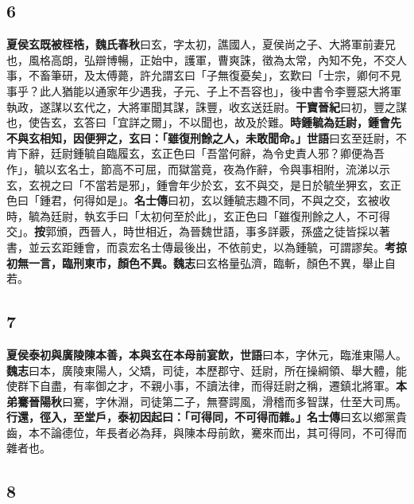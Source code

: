\subsection*{6}

\textbf{夏侯玄既被桎梏，}{\footnotesize \textbf{魏氏春秋}曰玄，字太初，譙國人，夏侯尚之子、大將軍前妻兄也，風格高朗，弘辯博暢，正始中，護軍，曹爽誅，徵為太常，內知不免，不交人事，不畜筆研，及太傅薨，許允謂玄曰「子無復憂矣」，玄歎曰「士宗，卿何不見事乎？此人猶能以通家年少遇我，子元、子上不吾容也」，後中書令李豐惡大將軍執政，遂謀以玄代之，大將軍聞其謀，誅豐，收玄送廷尉。\textbf{干寶晉紀}曰初，豐之謀也，使告玄，玄答曰「宜詳之爾」，不以聞也，故及於難。}\textbf{時鍾毓為廷尉，鍾會先不與玄相知，因便狎之，玄曰：「雖復刑餘之人，未敢聞命。」}{\footnotesize \textbf{世語}曰玄至廷尉，不肯下辭，廷尉鍾毓自臨履玄，玄正色曰「吾當何辭，為令史責人邪？卿便為吾作」，毓以玄名士，節高不可屈，而獄當竟，夜為作辭，令與事相附，流涕以示玄，玄視之曰「不當若是邪」，鍾會年少於玄，玄不與交，是日於毓坐狎玄，玄正色曰「鍾君，何得如是」。\textbf{名士傳}曰初，玄以鍾毓志趣不同，不與之交，玄被收時，毓為廷尉，執玄手曰「太初何至於此」，玄正色曰「雖復刑餘之人，不可得交」。\textbf{按}郭頒，西晉人，時世相近，為晉魏世語，事多詳覈，孫盛之徒皆採以著書，並云玄距鍾會，而袁宏名士傳最後出，不依前史，以為鍾毓，可謂謬矣。}\textbf{考掠初無一言，臨刑東市，顏色不異。}{\footnotesize \textbf{魏志}曰玄格量弘濟，臨斬，顏色不異，舉止自若。}

\subsection*{7}

\textbf{夏侯泰初與廣陵陳本善，本與玄在本母前宴飲，}{\footnotesize \textbf{世語}曰本，字休元，臨淮東陽人。\textbf{魏志}曰本，廣陵東陽人，父矯，司徒，本歷郡守、廷尉，所在操綱領、舉大體，能使群下自盡，有率御之才，不親小事，不讀法律，而得廷尉之稱，遷鎮北將軍。}\textbf{本弟騫}{\footnotesize \textbf{晉陽秋}曰騫，字休淵，司徒第二子，無謇諤風，滑稽而多智謀，仕至大司馬。}\textbf{行還，徑入，至堂戶，泰初因起曰：「可得同，不可得而雜。」}{\footnotesize \textbf{名士傳}曰玄以鄉黨貴齒，本不論德位，年長者必為拜，與陳本母前飲，騫來而出，其可得同，不可得而雜者也。}

\subsection*{8}

